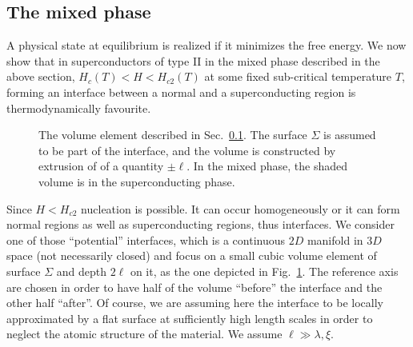 \subsection{The mixed phase}\label{subsec:the mixed phase}

A physical state at equilibrium is realized if it minimizes the free energy. We now show that in superconductors of type II in the mixed phase described in the above section, $H_c(T) < H < H_{c2}(T)$ at some fixed sub-critical temperature $T$, forming an interface between a normal and a superconducting region is thermodynamically favourite.

\begin{figure}
    \centering
    
    \caption{The volume element described in Sec.~\ref{subsec:the mixed phase}. The surface $\Sigma$ is assumed to be part of the interface, and the volume is constructed by extrusion of of a quantity $\pm\ell$. In the mixed phase, the shaded volume is in the superconducting phase.}
    \label{fig:interface}
\end{figure}

Since $H < H_{c2}$ nucleation is possible. It can occur homogeneously or it can form normal regions as well as superconducting regions, thus interfaces. We consider one of those ``potential'' interfaces, which is a continuous $2D$ manifold in $3D$ space (not necessarily closed) and focus on a small cubic volume element of surface $\Sigma$ and depth $2\ell$ on it, as the one depicted in Fig.~\ref{fig:interface}. The reference axis are chosen in order to have half of the volume ``before'' the interface and the other half ``after''. Of course, we are assuming here the interface to be locally approximated by a flat surface at sufficiently high length scales in order to neglect the atomic structure of the material. We assume $\ell \gg \lambda,\xi$.

